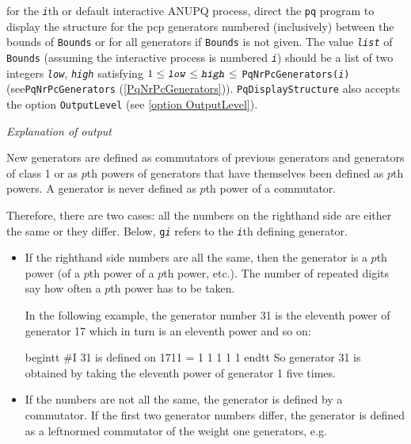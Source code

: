 \documentclass[a4paper,11pt]{report}
\begin{document}
{{{ for the \mbox{\texttt{\mdseries\slshape i}}th or default interactive \textsf{ANUPQ} process, direct the \texttt{pq} program to display the structure for the pcp generators numbered (inclusively)
between the bounds of \texttt{Bounds} or for all generators if \texttt{Bounds} is not given. The value \mbox{\texttt{\mdseries\slshape list}} of \texttt{Bounds} (assuming the interactive process is numbered \mbox{\texttt{\mdseries\slshape i}}) should be a list of two integers  \mbox{\texttt{\mdseries\slshape low}}, \mbox{\texttt{\mdseries\slshape high}} satisfying $1 \le \mbox{\texttt{\mdseries\slshape low}} \le \mbox{\texttt{\mdseries\slshape high}} \le $ \texttt{PqNrPcGenerators(\mbox{\texttt{\mdseries\slshape i}})} (see{\nobreakspace}\texttt{PqNrPcGenerators} (\ref{PqNrPcGenerators})). \texttt{PqDisplayStructure} also accepts the option \texttt{OutputLevel} (see \ref{option OutputLevel}). 

 \emph{Explanation of output} 

 New generators are defined as commutators of previous generators and
generators of class 1 or as $p$\texttt{}th powers of generators that have themselves been defined
as $p$\texttt{}th powers. A generator is never defined as $p$\texttt{}th power of a commutator. 

 Therefore, there are two cases: all the numbers on the righthand side are
either the same or they differ. Below, \texttt{g\mbox{\texttt{\mdseries\slshape i}}} refers to the \mbox{\texttt{\mdseries\slshape i}}th defining generator. 
\begin{itemize}
\item  If the righthand side numbers are all the same, then the generator is a $p$\texttt{}th power (of a $p$\texttt{}th power of a $p$\texttt{}th power, etc.). The number of repeated digits say how
often a $p$\texttt{}th power has to be taken. 

 In the following example, the generator number 31 is the eleventh power of
generator 17 which in turn is an eleventh power and so on: 

 \texttt{}begintt \#I 31 is defined on 17\texttt{}11 = 1
1 1 1 1 \texttt{}endtt So generator 31 is obtained by taking the
eleventh power of generator 1 five times. 
\item  If the numbers are not all the same, the generator is defined by a commutator.
If the first two generator numbers differ, the generator is defined as a
left\texttt{}normed commutator of the weight one generators, e.g. 


\end{itemize}}}}
\end{document}
